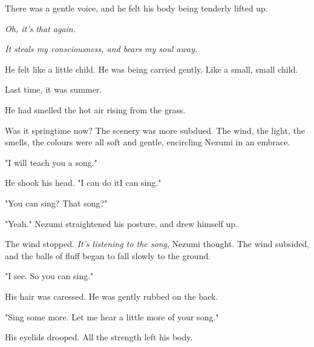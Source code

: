 There was a gentle voice, and he felt his body being tenderly lifted up.

\emph{Oh, it's that again.}

\emph{It steals my consciousness, and bears my soul away.}

He felt like a little child. He was being carried gently. Like a small,
small child.

Last time, it was summer.

He had smelled the hot air rising from the grass.

Was it springtime now? The scenery was more subdued. The wind, the
light, the smells, the colours were all soft and gentle, encircling
Nezumi in an embrace.

"I will teach you a song."

He shook his head. "I can do it\el I can sing."

"You can sing? That song?"

"Yeah." Nezumi straightened his posture, and drew himself up.


The wind stopped. \emph{It's listening to the song}, Nezumi thought. The wind
subsided, and the balls of fluff began to fall slowly to the ground.

"I see. So you can sing."

His hair was caressed. He was gently rubbed on the back.

"Sing some more. Let me hear a little more of your song."


His eyelids drooped. All the strength left his body.

